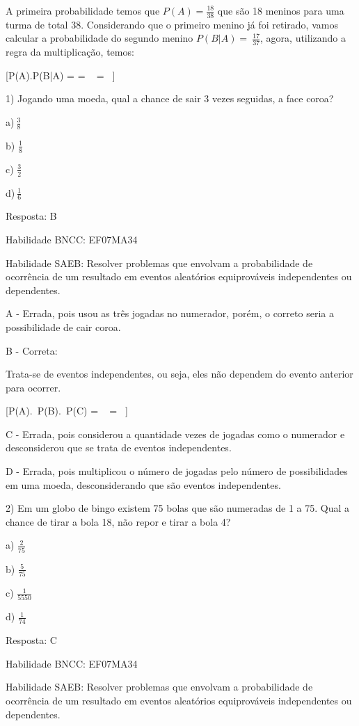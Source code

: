 A primeira probabilidade temos que \(P(A) = \frac{18}{38}\) que são 18
meninos para uma turma de total 38. Considerando que o primeiro menino
já foi retirado, vamos calcular a probabilidade do segundo menino
\(P(B|A) = \ \frac{17}{37}\), agora, utilizando a regra da
multiplicação, temos:

[P(A).P(B|A) =  \times {} = \  = \ ]


1) Jogando uma moeda, qual a chance de sair 3 vezes seguidas, a face
coroa?

a)\(\ \frac{3}{8}\)

b) \(\frac{1}{8}\)

c) \(\frac{3}{2}\)

d)\(\ \frac{1}{6}\)

Resposta: B

Habilidade BNCC: EF07MA34

Habilidade SAEB: Resolver problemas que envolvam a probabilidade de
ocorrência de um resultado em eventos aleatórios equiprováveis
independentes ou dependentes.

A - Errada, pois usou as três jogadas no numerador, porém, o correto
seria a possibilidade de cair coroa.

B - Correta:

Trata-se de eventos independentes, ou seja, eles não dependem do evento
anterior para ocorrer.

[P(A).\ P(B).\ P(C) = \  \times {} \times {} = \ ]

C - Errada, pois considerou a quantidade vezes de jogadas como o
numerador e desconsiderou que se trata de eventos independentes.

D - Errada, pois multiplicou o número de jogadas pelo número de
possibilidades em uma moeda, desconsiderando que são eventos
independentes.

2) Em um globo de bingo existem 75 bolas que são numeradas de 1 a 75.
Qual a chance de tirar a bola 18, não repor e tirar a bola 4?

a) \(\frac{2}{75}\)

b) \(\frac{5}{75}\)

c) \(\frac{1}{5550}\)

d) \(\frac{1}{74}\)

Resposta: C

Habilidade BNCC: EF07MA34

Habilidade SAEB: Resolver problemas que envolvam a probabilidade de
ocorrência de um resultado em eventos aleatórios equiprováveis
independentes ou dependentes.

